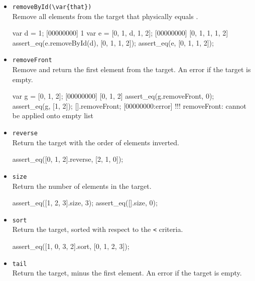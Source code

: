 \begin{itemize}
\item \lstinline|removeById(\var{that})|\\
Remove all elements from the target that physically equals .

\begin{urbiscript}[firstnumber=last]
var d = 1;
[00000000] 1
var e = [0, 1, d, 1, 2];
[00000000] [0, 1, 1, 1, 2]
assert_eq(e.removeById(d), [0, 1, 1, 2]);
assert_eq(e, [0, 1, 1, 2]);
\end{urbiscript}

\item \lstinline|removeFront|\\
Remove and return the first element from the target. An error if the
target is empty.

\begin{urbiscript}[firstnumber=last]
var g = [0, 1, 2];
[00000000] [0, 1, 2]
assert_eq(g.removeFront, 0);
assert_eq(g, [1, 2]);
[].removeFront;
[00000000:error] !!! removeFront: cannot be applied onto empty list
\end{urbiscript}

\item \lstinline|reverse|\\
Return the target with the order of elements inverted.

\begin{urbiscript}[firstnumber=last]
assert_eq([0, 1, 2].reverse, [2, 1, 0]);
\end{urbiscript}

\item \lstinline|size|\\
Return the number of elements in the target.

\begin{urbiscript}[firstnumber=last]
assert_eq([1, 2, 3].size, 3);
assert_eq([].size, 0);
\end{urbiscript}

\item \lstinline|sort|\\
Return the target, sorted with respect to the \lstinline|<| criteria.

\begin{urbiscript}[firstnumber=last]
assert_eq([1, 0, 3, 2].sort, [0, 1, 2, 3]);
\end{urbiscript}

\item \lstinline|tail|\\
Return the target, minus the first element. An error if the target is
empty.


\end{itemize}
